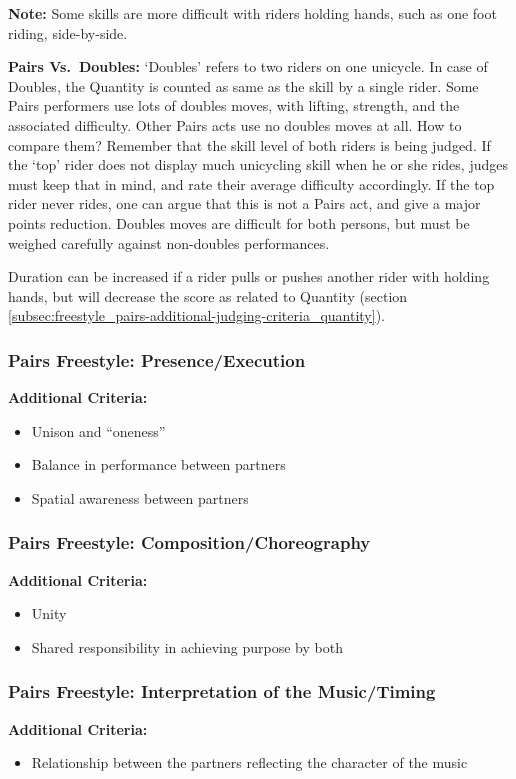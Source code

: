 \textbf{Note:} Some skills are more difficult with riders holding hands, such as one foot riding, side-by-side.

\textbf{Pairs Vs.\ Doubles:} `Doubles' refers to two riders on one unicycle.
In case of Doubles, the Quantity is counted as same as the skill by a single rider.
Some Pairs performers use lots of doubles moves, with lifting, strength, and the associated difficulty.
Other Pairs acts use no doubles moves at all.
How to compare them?
Remember that the skill level of both riders is being judged.
If the `top' rider does not display much unicycling skill when he or she rides, judges must keep that in mind, and rate their average difficulty accordingly.
If the top rider never rides, one can argue that this is not a Pairs act, and give a major points reduction.
Doubles moves are difficult for both persons, but must be weighed carefully against non-doubles performances.

Duration can be increased if a rider pulls or pushes another rider with holding hands, but will decrease the score as related to Quantity (section \ref{subsec:freestyle_pairs-additional-judging-criteria_quantity}).

\subsubsection{Pairs Freestyle: Presence/Execution}
\textbf{Additional Criteria:}
\begin{itemize}
\item Unison and ``oneness''
\item Balance in performance between partners
\item Spatial awareness between partners
\end{itemize}

\subsubsection{Pairs Freestyle: Composition/Choreography}
\textbf{Additional Criteria:}
\begin{itemize}
\item Unity
\item Shared responsibility in achieving purpose by both
\end{itemize}

\subsubsection{Pairs Freestyle: Interpretation of the Music/Timing}
\textbf{Additional Criteria:}
\begin{itemize}
\item Relationship between the partners reflecting the character of the music
\end{itemize}

